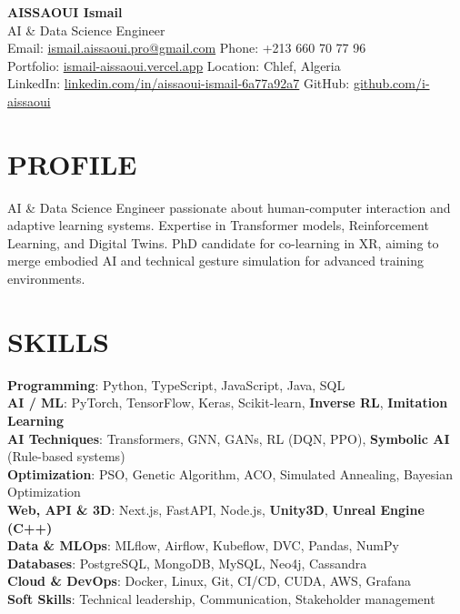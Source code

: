 \documentclass[a4paper,12pt]{article}
\begin{document}
\begin{center}
    {\Huge\bfseries\color{titleblue} AISSAOUI Ismail}\\[4pt]
    {\Large AI \& Data Science Engineer}\\[6pt]

    {\normalsize
    Email: \href{mailto:ismail.aissaoui.pro@gmail.com}{ismail.aissaoui.pro@gmail.com} \quad
    Phone: +213 660 70 77 96 \\
    Portfolio: \href{https://ismail-aissaoui.vercel.app}{ismail-aissaoui.vercel.app} \quad
    Location: Chlef, Algeria \\
    LinkedIn: \href{https://linkedin.com/in/aissaoui-ismail-6a77a92a7}{linkedin.com/in/aissaoui-ismail-6a77a92a7} \quad
    GitHub: \href{https://github.com/i-aissaoui}{github.com/i-aissaoui}
    }
\end{center}

\section{PROFILE}
AI \& Data Science Engineer passionate about human-computer interaction and adaptive learning systems. Expertise in Transformer models, Reinforcement Learning, and Digital Twins. PhD candidate for co-learning in XR, aiming to merge embodied AI and technical gesture simulation for advanced training environments.

\section{SKILLS}
\setlength{\parskip}{-1pt}
{\normalsize
\textbf{Programming}: Python, TypeScript, JavaScript, Java, SQL \\

\textbf{AI / ML}: PyTorch, TensorFlow, Keras, Scikit-learn, \textbf{Inverse RL}, \textbf{Imitation Learning} \\

\textbf{AI Techniques}: Transformers, GNN, GANs, RL (DQN, PPO), \textbf{Symbolic AI} (Rule-based systems) \\

\textbf{Optimization}: PSO, Genetic Algorithm, ACO, Simulated Annealing, Bayesian Optimization \\

\textbf{Web, API \& 3D}: Next.js, FastAPI, Node.js, \textbf{Unity3D}, \textbf{Unreal Engine (C++)} \\

\textbf{Data \& MLOps}: MLflow, Airflow, Kubeflow, DVC, Pandas, NumPy \\

\textbf{Databases}: PostgreSQL, MongoDB, MySQL, Neo4j, Cassandra \\

\textbf{Cloud \& DevOps}: Docker, Linux, Git, CI/CD, CUDA, AWS, Grafana \\

\textbf{Soft Skills}: Technical leadership, Communication, Stakeholder management
}
\end{document}
